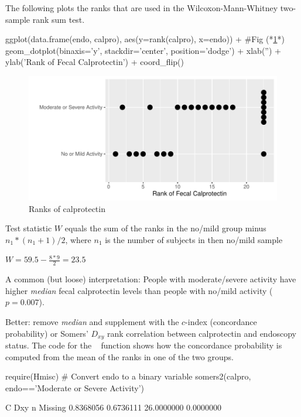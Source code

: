 The following plots the ranks that are used in the
Wilcoxon-Mann-Whitney two-sample rank sum test.
\begin{Schunk}
\begin{Sinput}
ggplot(data.frame(endo, calpro), aes(y=rank(calpro), x=endo)) + #Fig (*\ref{fig:nonpar-calpror}*)
  geom_dotplot(binaxis='y', stackdir='center', position='dodge') +
    xlab('') + ylab('Rank of Fecal Calprotectin') + coord_flip()
\end{Sinput}
\begin{figure}[htbp]

\centerline{\includegraphics[width=\maxwidth]{nonpar-calpror-1} }

\caption[Ranks of calprotectin]{Ranks of calprotectin}\label{fig:nonpar-calpror}
\end{figure}
\end{Schunk}
\bi
\item Test statistic $W$ equals the sum of the ranks in the no/mild group minus $n_1 * (n_1 + 1) / 2$, where $n_1$ is the number of subjects in then no/mild sample
\item $W = 59.5 - \frac{8*9}{2} = 23.5$
\item A common (but loose) interpretation: People with moderate/severe activity have higher \textit{median} fecal calprotectin levels than people with no/mild activity ($p = 0.007$).
\item Better: remove \textit{median} and supplement with the $c$-index
  (concordance probability) or Somers' $D_{xy}$ rank correlation
  between calprotectin and endoscopy status.  The code for the \R\
   function shows how the concordance probability is
  computed from the mean of the ranks in one of the two groups.
\ei
\begin{Schunk}
\begin{Sinput}
require(Hmisc)
# Convert endo to a binary variable
somers2(calpro, endo=='Moderate or Severe Activity')
\end{Sinput}
\begin{Soutput}
         C        Dxy          n    Missing 
 0.8368056  0.6736111 26.0000000  0.0000000 
\end{Soutput}
\end{Schunk}
